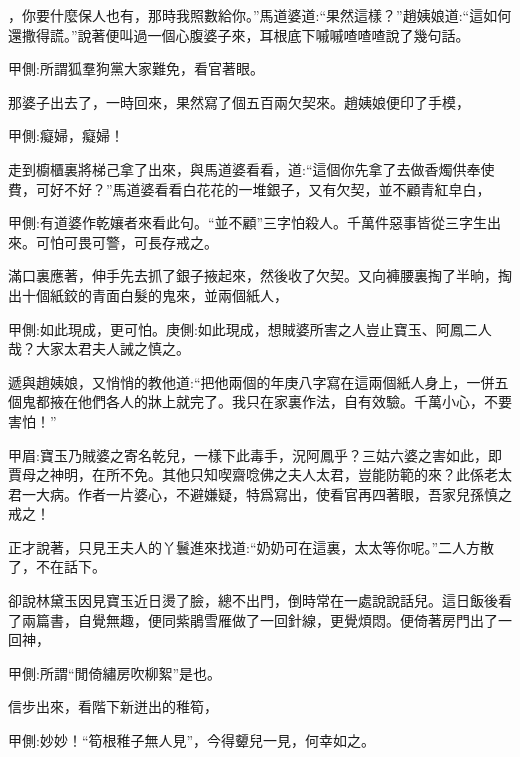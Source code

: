 \begin{parag}
，你要什麼保人也有，那時我照數給你。”馬道婆道:“果然這樣？”趙姨娘道:“這如何還撒得謊。”說著便叫過一個心腹婆子來，耳根底下嘁嘁喳喳喳說了幾句話。\begin{note}甲側:所謂狐羣狗黨大家難免，看官著眼。\end{note}那婆子出去了，一時回來，果然寫了個五百兩欠契來。趙姨娘便印了手模，\begin{note}甲側:癡婦，癡婦！\end{note}走到櫥櫃裏將梯己拿了出來，與馬道婆看看，道:“這個你先拿了去做香燭供奉使費，可好不好？”馬道婆看看白花花的一堆銀子，又有欠契，並不顧青紅皁白，\begin{note}甲側:有道婆作乾孃者來看此句。“並不顧”三字怕殺人。千萬件惡事皆從三字生出來。可怕可畏可警，可長存戒之。\end{note}滿口裏應著，伸手先去抓了銀子掖起來，然後收了欠契。又向褲腰裏掏了半晌，掏出十個紙鉸的青面白髮的鬼來，並兩個紙人，\begin{note}甲側:如此現成，更可怕。庚側:如此現成，想賊婆所害之人豈止寶玉、阿鳳二人哉？大家太君夫人誡之慎之。\end{note}遞與趙姨娘，又悄悄的教他道:“把他兩個的年庚八字寫在這兩個紙人身上，一併五個鬼都掖在他們各人的牀上就完了。我只在家裏作法，自有效驗。千萬小心，不要害怕！”\begin{note}甲眉:寶玉乃賊婆之寄名乾兒，一樣下此毒手，況阿鳳乎？三姑六婆之害如此，即賈母之神明，在所不免。其他只知喫齋唸佛之夫人太君，豈能防範的來？此係老太君一大病。作者一片婆心，不避嫌疑，特爲寫出，使看官再四著眼，吾家兒孫慎之戒之！\end{note}正才說著，只見王夫人的丫鬟進來找道:“奶奶可在這裏，太太等你呢。”二人方散了，不在話下。
\end{parag}


\begin{parag}
    卻說林黛玉因見寶玉近日燙了臉，總不出門，倒時常在一處說說話兒。這日飯後看了兩篇書，自覺無趣，便同紫鵑雪雁做了一回針線，更覺煩悶。便倚著房門出了一回神，\begin{note}甲側:所謂“閒倚繡房吹柳絮”是也。\end{note}信步出來，看階下新迸出的稚筍，\begin{note}甲側:妙妙！“筍根稚子無人見”，今得顰兒一見，何幸如之。\end{note}
\end{parag}


